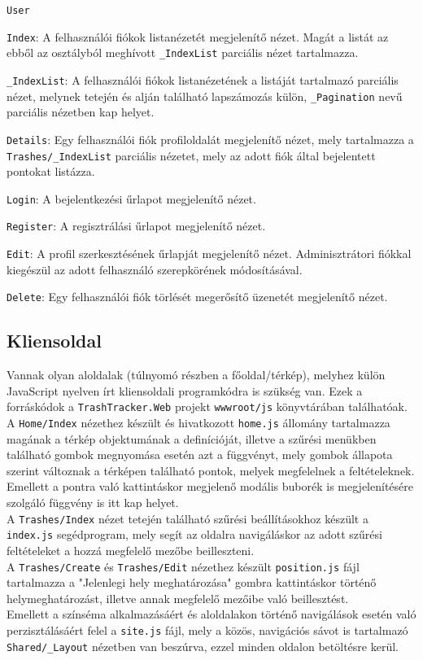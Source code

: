 \texttt{User}
\begin{compactitem}
\item \texttt{Index}: A felhasználói fiókok listanézetét megjelenítő nézet. Magát a listát az ebből az osztályból meghívott \texttt{\_IndexList} parciális nézet tartalmazza.
\begin{compactitem}
	\item \texttt{\_IndexList}: A felhasználói fiókok listanézetének a listáját tartalmazó parciális nézet, melynek tetején és alján található lapszámozás külön, \texttt{\_Pagination} nevű parciális nézetben kap helyet.
\end{compactitem}
\item \texttt{Details}: Egy felhasználói fiók profiloldalát megjelenítő nézet, mely tartalmazza a \texttt{Trashes/\_IndexList} parciális nézetet, mely az adott fiók által bejelentett pontokat listázza.
\item \texttt{Login}: A bejelentkezési űrlapot megjelenítő nézet.
\item \texttt{Register}: A regisztrálási űrlapot megjelenítő nézet.
\item \texttt{Edit}: A profil szerkesztésének űrlapját megjelenítő nézet. Adminisztrátori fiókkal kiegészül az adott felhasználó szerepkörének módosításával.
\item \texttt{Delete}: Egy felhasználói fiók törlését megerősítő üzenetét megjelenítő nézet.
\end{compactitem}

\subsection{Kliensoldal}

Vannak olyan aloldalak (túlnyomó részben a főoldal/térkép), melyhez külön JavaScript nyelven írt kliensoldali programkódra is szükség van. Ezek a forráskódok a \texttt{TrashTracker.Web} projekt \texttt{wwwroot/js} könyvtárában találhatóak.\\
A \texttt{Home/Index} nézethez készült és hivatkozott \texttt{home.js} állomány tartalmazza magának a térkép objektumának a definícióját, illetve a szűrési menükben található gombok megnyomása esetén azt a függvényt, mely gombok állapota szerint változnak a térképen található pontok, melyek megfelelnek a feltételeknek. Emellett a pontra való kattintáskor megjelenő modális buborék is megjelenítésére szolgáló függvény is itt kap helyet.\\
A \texttt{Trashes/Index} nézet tetején található szűrési beállításokhoz készült a \texttt{index.js} segédprogram, mely segít az oldalra navigáláskor az adott szűrési feltételeket a hozzá megfelelő mezőbe beilleszteni.\\
A \texttt{Trashes/Create} és \texttt{Trashes/Edit} nézethez készült \texttt{position.js} fájl tartalmazza a "Jelenlegi hely meghatározása" gombra kattintáskor történő helymeghatározást, illetve annak megfelelő mezőibe való beillesztést.\\
Emellett a színséma alkalmazásáért és aloldalakon történő navigálások esetén való perzisztálásáért felel a \texttt{site.js} fájl, mely a közös, navigációs sávot is tartalmazó \texttt{Shared/\_Layout} nézetben van beszúrva, ezzel minden oldalon betöltésre kerül.

